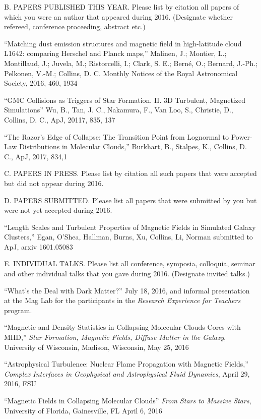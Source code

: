 \newpage

\noindent B. PAPERS PUBLISHED THIS YEAR. Please list by citation all
papers of which you were an author that appeared during 2016.
(Designate whether refereed, conference proceeding, abstract etc.)
\bigskip

``Matching dust
emission structures and magnetic field in high-latitude cloud L1642: comparing
Herschel and Planck maps,''
Malinen, J.; Montier, L.; Montillaud, J.; Juvela, M.; Ristorcelli, I.; Clark, S.
E.; Bern\'e, O.; Bernard, J.-Ph.; Pelkonen, V.-M.; Collins, D. C. Monthly
Notices of the Royal Astronomical Society, 2016, 460, 1934

``GMC Collisions as Triggers of Star Formation. II. 3D Turbulent, Magnetized
Simulations'' Wu, B., Tan, J. C., Nakamura, F., Van Loo, S., Christie, D.,
Collins, D. C., ApJ, 20117, 835, 137

``The Razor’s Edge of Collapse: The Transition Point from Lognormal to Power-Law
Distributions in Molecular Clouds,'' Burkhart, B., Stalpes, K., Collins, D. C.,
ApJ, 2017, 834,1

\noindent C. PAPERS IN PRESS. Please list by citation all such
papers that were accepted but did not appear during 2016.
\bigskip


\noindent D. PAPERS SUBMITTED. Please list all papers that were
submitted by you but were not yet accepted during 2016.
\bigskip

``Length Scales and
Turbulent Properties of Magnetic Fields in Simulated Galaxy Clusters,'' Egan, O’Shea, Hallman, Burns, Xu, Collins, Li, Norman  submitted
to ApJ, arxiv 1601.05083
\bigskip

\noindent E. INDIVIDUAL TALKS. Please list all conference, symposia,
colloquia, seminar and other individual talks that you gave during
2016.  (Designate invited talks.)
\bigskip
%

``What’s the Deal with Dark Matter?'' July 18, 2016, and informal presentation
 at the Mag Lab for the participants in the \emph{Research Experience for
Teachers} program.

``Magnetic and Density Statistics in Collapsing Molecular Clouds Cores with
MHD,'' {\it Star Formation, Magnetic Fields, Diffuse Matter in the Galaxy}, University
of Wisconsin, Madison,
Wisconsin, May 25, 2016

``Astrophysical Turbulence: Nuclear Flame Propagation with Magnetic Fields,''
{\it Complex Interfaces in Geophysical and Astrophysical Fluid Dynamics}, April 29,
2016, FSU

``Magnetic Fields in Collapsing Molecular Clouds'' {\it From Stars to Massive
Stars},
University of Florida, Gainesville, FL April 6, 2016

